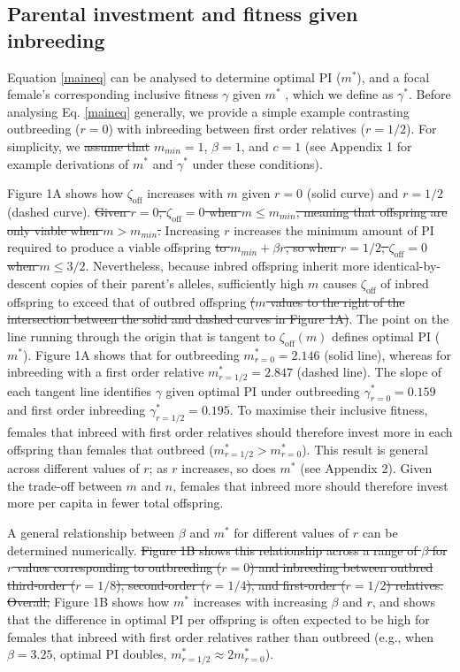 \documentclass[12pt]{article}
\begin{document}
\subsection*{Parental investment and fitness given inbreeding}

Equation \ref{maineq} can be analysed to determine optimal PI ($m^{*}$), and a focal female's corresponding inclusive fitness $\gamma$ given $m^{*}$ \cite[][]{Kuijper2012}, which we define as $\gamma^{*}$. Before analysing Eq. \ref{maineq} generally, we provide a simple example contrasting outbreeding ($r=0$) with inbreeding between first order relatives ($r=1/2$). For simplicity, we {\color{red}\st{assume that}} {\color{blue}{set parameter values equal to}} $m_{min}=1$, $\beta=1$, and $c=1$ (see Appendix 1 for example derivations of $m^{*}$ and $\gamma^{*}$ under these conditions).

Figure 1A shows how $\zeta_{\textrm{off}}$ increases with $m$ given $r=0$ (solid curve) and $r=1/2$ (dashed curve). {\color{red}\st{Given $r=0$, $\zeta_{\textrm{off}}=0$ when $m \leq m_{min}$, meaning that offspring are only viable when $m>m_{min}$.}} Increasing $r$ increases the minimum amount of PI required to produce a viable offspring {\color{red}\st{to $m_{min}+\beta r$, so when $r=1/2$, $\zeta_{\textrm{off}}=0$ when $m \leq 3/2$}}. Nevertheless, because inbred offspring inherit more identical-by-descent copies of their parent's alleles, sufficiently high $m$ causes $\zeta_{\textrm{off}}$ of inbred offspring to exceed that of outbred offspring {\color{red}\st{($m$ values to the right of the intersection between the solid and dashed curves in Figure 1A)}}. The point on the line running through the origin that is tangent to $\zeta_{\textrm{off}}(m)$ defines optimal PI ($m^{*}$). Figure 1A shows that for outbreeding $m^{*}_{r=0}=2.146$ (solid line), whereas for inbreeding with a first order relative $m^{*}_{r=1/2}=2.847$ (dashed line). The slope of each tangent line identifies $\gamma$ given optimal PI under outbreeding $\gamma^{*}_{r=0}=0.159$ and first order inbreeding $\gamma^{*}_{r=1/2}=0.195$. To maximise their inclusive fitness, females that inbreed with first order relatives should therefore invest more in each offspring than females that outbreed ($m^{*}_{r=1/2}>m^{*}_{r=0}$). This result is general across different values of $r$; as $r$ increases, so does $m^{*}$ (see Appendix 2). Given the trade-off between $m$ and $n$, females that inbreed more should therefore invest more per capita in fewer total offspring. 

A general relationship between $\beta$ and $m^{*}$ for different values of $r$ can be determined numerically. {\color{red}\st{Figure 1B shows this relationship across a range of $\beta$ for $r$ values corresponding to outbreeding ($r=0$) and inbreeding between outbred third-order ($r=1/8$), second-order ($r=1/4$), and first-order ($r=1/2$) relatives. Overall,}} Figure 1B shows how $m^{*}$ increases with increasing $\beta$ and $r$, and shows that the difference in optimal PI per offspring is often expected to be high for females that inbreed with first order relatives rather than outbreed (e.g., when $\beta=3.25$, optimal PI doubles, $m^{*}_{r=1/2} \approx 2m^{*}_{r=0}$).
\end{document}
